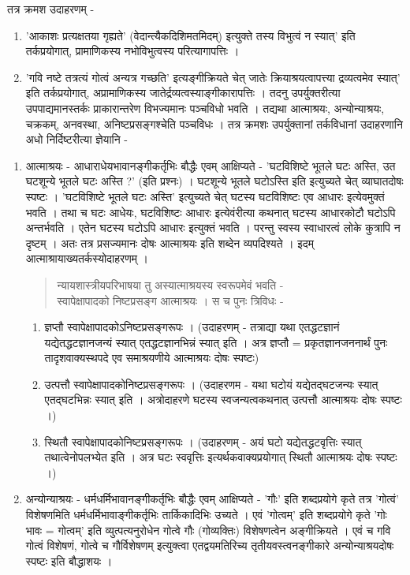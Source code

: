 तत्र क्रमश उदाहरणम् - 
\begin{enumerate}
\item	'आकाशः प्रत्यक्षतया गृह्यते' (वेदान्त्यैकदिशिमतमिदम्) इत्युक्ते तस्य विभुत्वं न  स्यात्' इति तर्कप्रयोगात्, प्रामाणिकस्य नभोविभुत्वस्य परित्यागापत्तिः ।
\item	'गवि नष्टे तत्रत्यं गोत्वं अन्यत्र गच्छति' इत्यङ्गीक्रियते चेत् जातेः क्रियाश्रयत्वापत्त्या  द्रव्यत्वमेव स्यात्' इति तर्कप्रयोगात्, अप्रामाणिकस्य जातेर्द्रव्यत्वस्याङ्गीकारापत्तिः । तदनु उपर्युक्तरीत्या उपपाद्यमानस्तर्कः प्राकारान्तरेण विभज्यमानः पञ्चविधो भवति । तद्यथा आत्माश्रयः, अन्योन्याश्रयः, चक्रकम्, अनवस्था, अनिष्टप्रसङ्गश्चेति पञ्चविधः । तत्र क्रमशः उपर्युक्तानां तर्कविधानां उदाहरणानि अधो निर्दिष्टरीत्या ज्ञेयानि - 
\end{enumerate}
\begin{enumerate}
\item आत्माश्रयः - आधाराधेयभावानङ्गीकर्तृभिः बौद्धैः एवम् आक्षिप्यते - 'घटविशिष्टे भूतले घटः अस्ति, उत घटशून्ये भूतले घटः अस्ति ?' (इति प्रश्नः) । घटशून्ये भूतले घटोऽस्ति इति इत्युच्यते चेत् व्याघातदोषः स्पष्टः । 'घटविशिष्टे भूतले घटः अस्ति' इत्युच्यते चेत् घटस्य घटविशिष्टः एव आधारः इत्येवमुक्तं भवति । तथा च घटः आधेयः, घटविशिष्टः आधारः इत्येवंरीत्या कथनात् घटस्य आधारकोटौ घटोऽपि अन्तर्भवति । एतेन घटस्य घटोऽपि आधारः इत्युक्तं भवति । परन्तु स्वस्य स्वाधारत्वं लोके कुत्रापि न दृष्टम् । अतः तत्र प्रसज्यमानः दोषः आत्माश्रयः इति शब्देन व्यपदिश्यते । इदम् आत्माश्रायाख्यतर्कस्योदाहरणम् । 
\begin{verse}
न्यायशास्त्रीयपरिभाषया तु अस्यात्माश्रयस्य स्वरूपमेवं भवति - \\
स्वापेक्षापादको निष्टप्रसङ्ग आत्माश्रयः । स च पुनः त्रिविधः  -
\end{verse}
	\begin{enumerate}
		\item	ज्ञप्तौ स्वापेक्षापादकोऽनिष्टप्रसङ्गरूपः । (उदाहरणम् - तत्राद्या यथा एतद्धटज्ञानं  यद्येतद्धटज्ञानजन्यं स्यात् एतद्धटज्ञानभिन्नं स्यात् इति । अत्र ज्ञप्तौ = प्रकृतज्ञानजननार्थं पुनः तादृशवाक्यस्थपदे एव समाश्रयणीये आत्माश्रयः दोषः स्पष्टः)
		\item	उत्पत्तौ स्वापेक्षापादकोनिष्टप्रसङ्गरूपः । (उदाहरणम - यथा घटोयं यद्येतद्घटजन्यः  स्यात् एतद्घटभिन्नः स्यात् इति । अत्रोदाहरणे घटस्य स्वजन्यत्वकथनात् उत्पत्तौ आत्माश्रयः दोषः स्पष्टः ।)
		\item	स्थितौ स्वापेक्षापादकोनिष्टप्रसङ्गरूपः । (उदाहरणम् - अयं घटो यद्येतद्धटवृत्तिः  स्यात् तथात्वेनोपलभ्येत इति । अत्र घटः स्ववृत्तिः इत्यर्थकवाक्यप्रयोगात् स्थितौ आत्माश्रयः दोषः स्पष्टः ।)
	\end{enumerate}
\item	अन्योन्याश्रयः - धर्मधर्मिभावानङ्गीकर्तृभिः बौद्धैः एवम् आक्षिप्यते - 'गौः' इति  शब्दप्रयोगे कृते तत्र 'गोत्वं' विशेषणमिति धर्मधर्मिभावाङ्गीकर्तृभिः तार्किकादिभिः उच्यते । एवं 'गोत्वम्' इति शब्दप्रयोगे कृते 'गोः भावः = गोत्वम्' इति व्युत्पत्यनुरोधेन गोत्वे गौः (गोव्यक्तिः) विशेषणत्वेन अङ्गीक्रियते । एवं च गवि गोत्वं विशेषणं, गोत्वे च गौर्विशेषणम् इत्युक्त्वा एतद्वयमतिरिच्य तृतीयवस्त्वनङ्गीकारे अन्योन्याश्रयदोषः स्पष्टः इति बौद्धाशयः ।  


\end{enumerate}
